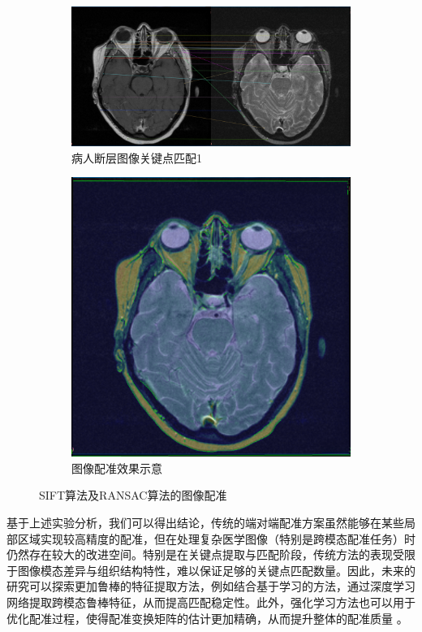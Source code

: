 \documentclass[a4paper, utf8]{ctexart}
\begin{document}
\begin{figure}[htbp]
		\begin{subfigure}{.6\textwidth}
			\centering
			\includegraphics[height=.13\textheight]{./figure/match_opencv_3.png}
			\caption{病人断层图像关键点匹配1}
		\end{subfigure}
		\begin{subfigure}{.3\textwidth}
			\centering
			\includegraphics[height=.13\textheight]{./figure/compare_opencv_3.png}
			\caption{图像配准效果示意}
		\end{subfigure}
		
		\caption{SIFT算法及RANSAC算法的图像配准}
	\end{figure}
	
	基于上述实验分析，我们可以得出结论，传统的端对端配准方案虽然能够在某些局部区域实现较高精度的配准，但在处理复杂医学图像（特别是跨模态配准任务）时仍然存在较大的改进空间。特别是在关键点提取与匹配阶段，传统方法的表现受限于图像模态差异与组织结构特性，难以保证足够的关键点匹配数量。因此，未来的研究可以探索更加鲁棒的特征提取方法，例如结合基于学习的方法，通过深度学习网络提取跨模态鲁棒特征，从而提高匹配稳定性。此外，强化学习方法也可以用于优化配准过程，使得配准变换矩阵的估计更加精确，从而提升整体的配准质量 \cite{reg}。
	
\end{document}
